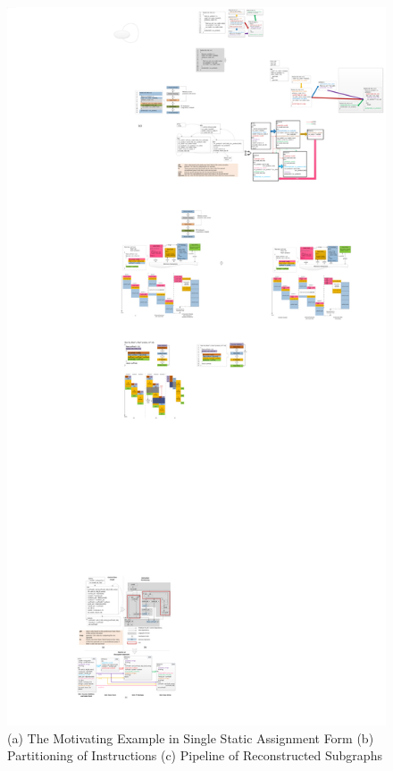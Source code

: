 \begin{figure}[htp]
\begin{center}
\includegraphics[width=1.0\linewidth]{chap3fig/totalflow.pdf}
\caption{(a) The Motivating Example in Single Static Assignment Form (b) Partitioning of Instructions (c) Pipeline of Reconstructed Subgraphs
\label{fig:totalFlow}}
\end{center}
\end{figure}

